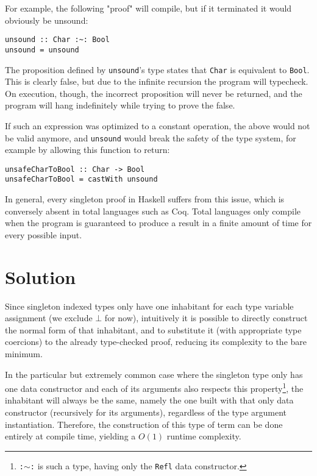 For example, the following "proof" will compile, but if it terminated it would obviously be unsound:

\begin{lstlisting}[caption=Proving the false through nontermination]
unsound :: Char :~: Bool
unsound = unsound
\end{lstlisting}

The proposition defined by \texttt{unsound}'s type states that \texttt{Char} is equivalent to \texttt{Bool}. This is clearly false, but due to the infinite recursion the program will typecheck. On execution, though, the incorrect proposition will never be returned, and the program will hang indefinitely while trying to prove the false.

If such an expression was optimized to a constant operation, the above would not be valid anymore, and \texttt{unsound} would break the safety of the type system, for example by allowing this function to return:

\begin{lstlisting}
unsafeCharToBool :: Char -> Bool
unsafeCharToBool = castWith unsound
\end{lstlisting}

In general, every singleton proof in Haskell suffers from this issue, which is conversely absent in total languages such as Coq.
Total languages only compile when the program is guaranteed to produce a result in a finite amount of time for every possible input.

\chapter{Solution}
\label{cha:solution}

Since singleton indexed types only have one inhabitant for each type variable assignment (we exclude $\bot$ for now), intuitively it is possible to directly construct the normal form of that inhabitant, and to substitute it (with appropriate type coercions) to the already type-checked proof, reducing its complexity to the bare minimum.

In the particular but extremely common case where the singleton type only has one data constructor and each of its arguments also respects this property\footnote{\texttt{:$\sim$:} is such a type, having only the \texttt{Refl} data constructor.}, the inhabitant will always be the same, namely the one built with that only data constructor (recursively for its arguments), regardless of the type argument instantiation.
Therefore, the construction of this type of term can be done entirely at compile time, yielding a $O(1)$ runtime complexity.

